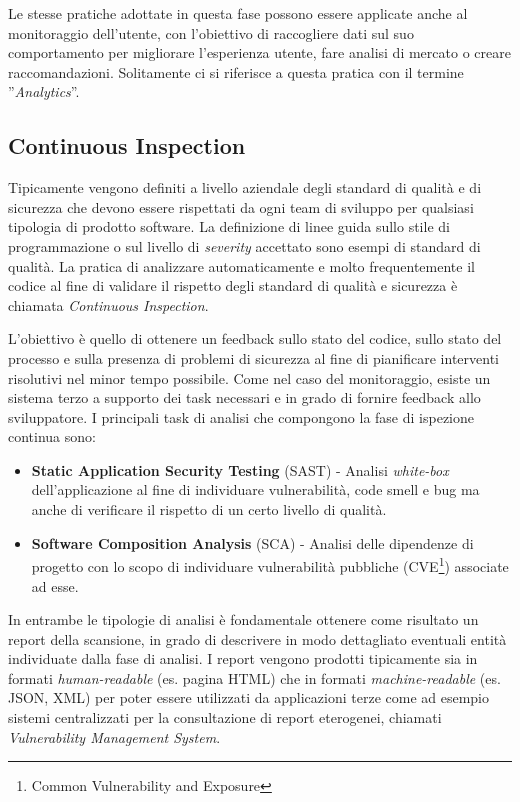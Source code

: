 Le stesse pratiche adottate in questa fase possono essere applicate anche al monitoraggio dell'utente,
con l'obiettivo di raccogliere dati sul suo comportamento per migliorare l'esperienza utente, 
fare analisi di mercato o creare raccomandazioni. 
Solitamente ci si riferisce a questa pratica con il termine ''\textit{Analytics}''.

\subsection{Continuous Inspection}
Tipicamente vengono definiti a livello aziendale degli standard di qualità e di sicurezza che devono essere rispettati da ogni team di sviluppo per qualsiasi tipologia di prodotto software. 
La definizione di linee guida sullo stile di programmazione o sul livello di \textit{severity} accettato sono esempi di standard di qualità. 
La pratica di analizzare automaticamente e molto frequentemente il codice al fine di validare il rispetto degli standard di qualità e sicurezza è chiamata \textit{Continuous Inspection}.

L’obiettivo è quello di ottenere un feedback sullo stato del codice, 
sullo stato del processo e sulla presenza di problemi di sicurezza al fine di pianificare interventi risolutivi nel minor tempo possibile.
Come nel caso del monitoraggio, 
esiste un sistema terzo a supporto dei task necessari e in grado di fornire feedback allo sviluppatore. 
I principali task di analisi che compongono la fase di ispezione continua sono:

\begin{itemize}
    \item \textbf{Static Application Security Testing} (SAST) - Analisi \textit{white-box} dell'applicazione al fine di individuare vulnerabilità, code smell e bug ma anche di verificare il rispetto di un certo livello di qualità.
    
    \item \textbf{Software Composition Analysis} (SCA) - Analisi delle dipendenze di progetto con lo scopo di individuare vulnerabilità pubbliche (CVE\footnote{Common Vulnerability and Exposure}) associate ad esse.
\end{itemize}

In entrambe le tipologie di analisi è fondamentale ottenere come risultato un report della scansione, 
in grado di descrivere in modo dettagliato eventuali entità individuate dalla fase di analisi. 
I report vengono prodotti tipicamente sia in formati \textit{human-readable} (es. pagina HTML) che in formati \textit{machine-readable} (es. JSON, XML) per poter essere utilizzati da applicazioni terze come ad esempio sistemi centralizzati per la consultazione di report eterogenei, chiamati \textit{Vulnerability Management System}.

